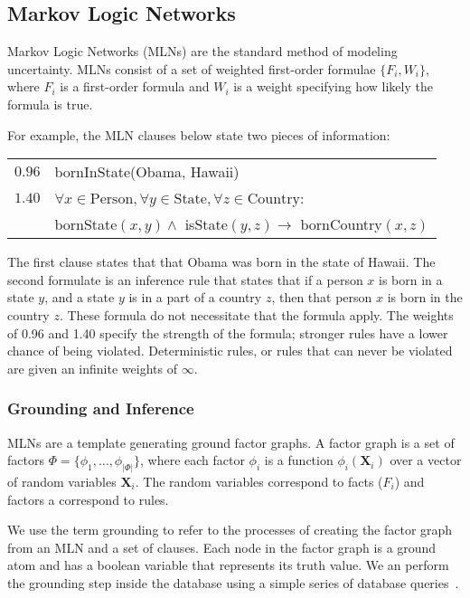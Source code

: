 \subsection{Markov Logic Networks}

Markov Logic Networks (MLNs) are the standard method of modeling uncertainty.
MLNs consist of a set of weighted first-order formulae \(\{F_i, W_i\}\),
where \(F_i\) is a first-order formula and \(W_i\) is a weight
specifying how likely the formula is true.

For example, the MLN clauses below state two pieces of information:

\vspace{5pt}
\noindent\begin{tabular}{l l}
\(0.96\) & bornInState(Obama, Hawaii)\\
\(1.40\) & $\forall x\in\text{Person}, \forall y\in\text{State}, \forall z\in\text{Country}$:\\
         & bornState$(x,y) \wedge$ isState$(y,z) \rightarrow$ bornCountry$(x,z)$
\end{tabular}

The first clause states that that Obama was born in the state of Hawaii.
The second formulate is an inference rule that states that if a person \(x\) is born in a state \(y\), and a state \(y\) is in a part of a country \(z\),
then that person \(x\) is born in the country \(z\).
These formula do not necessitate that the formula apply.
The weights of 0.96 and 1.40 specify the strength of the formula; stronger rules have a lower chance of being violated.
Deterministic rules, or rules that can never be violated are given an infinite weights of \(\infty\).


\subsubsection{Grounding and Inference}

MLNs are a template generating ground factor graphs.
A factor graph is a set of factors \(\Phi = \{ \phi_1, \ldots, \phi_{|\Phi|} \} \),
where each factor \(\phi_i\) is a function \(\phi_i (\mathbf{X}_i)\) over a
vector of random variables \(\mathbf{X}_i\).
The random variables correspond to facts (\(F_i\)) and factors a correspond to rules.

We use the term grounding to refer to the processes of creating the factor graph from an
MLN and a set of clauses.
Each node in the factor graph is a ground atom and has a boolean variable that represents its truth value.
We an perform the grounding step inside the database using a simple series of database queries~\cite{chen2014knowledge}.

